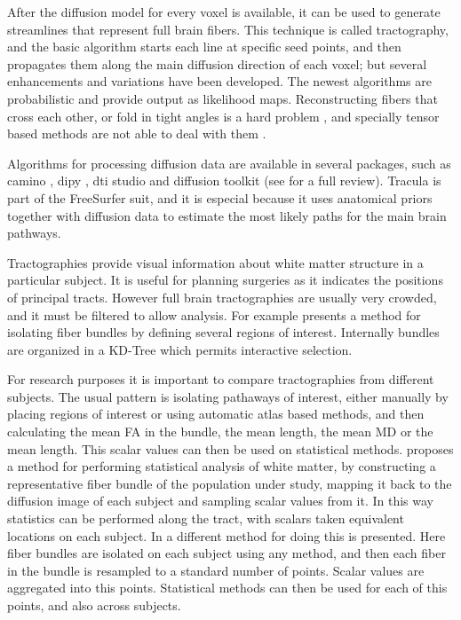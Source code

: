 After the diffusion model for every voxel is available, it can be used to generate streamlines that represent full brain fibers. This technique is called tractography, and the basic algorithm starts each line at specific seed points, and then propagates them along the main diffusion direction of each voxel; but several enhancements and variations have been developed. The newest algorithms are probabilistic \autocite{behrens_probabilistic_2007} and provide output as likelihood maps.
Reconstructing fibers that cross each other, or fold in tight angles is a hard problem \autocite{fillard_quantitative_2011}, and specially tensor based methods are not able to deal with them \autocite{tournier_diffusion_2011}. 

Algorithms for processing diffusion data are available in several packages, such as camino \autocite{cook_camino:_2006}, dipy \autocite{garyfallidis_dipy_2014}, dti studio \autocite{jiang_dtistudio:_2006} and diffusion toolkit \autocite{wang_diffusion_2007}
(see \autocite{hasan_review_2011} for a full review). 
Tracula \autocite{yendiki_probabilistic_2008} is part of the FreeSurfer suit, and it is especial because it uses anatomical priors together with diffusion data to estimate the most likely paths for the main brain pathways.


Tractographies provide visual information about white matter structure in a particular subject. It is useful for planning surgeries as it indicates the positions of principal tracts. However full brain tractographies are usually very crowded, and it must be filtered to allow analysis. 
For example \autocite{blaas_fast_2005} presents a method for isolating fiber bundles by defining several regions of interest. Internally bundles are organized in a KD-Tree which permits interactive selection. 


For research purposes it is important to compare tractographies from different subjects. The usual pattern is isolating pathaways of interest, either manually by placing regions of interest or using automatic atlas based methods, and then calculating the mean FA in the bundle, the mean length, the mean MD or the mean length. This scalar values can then be used on statistical methods.
\autocite{goodlett_group_2008} proposes a method for performing statistical analysis of white matter, by constructing a representative fiber bundle of the population under study, mapping it back to the diffusion image of each subject and sampling scalar values from it. In this way statistics can be performed along the tract, with scalars taken equivalent locations on each subject. In \autocite{colby_along-tract_2011} a different method for doing this is presented. Here fiber bundles are isolated on each subject using any method, and then each fiber in the bundle is resampled to a standard number of points. Scalar values are aggregated into this points. Statistical methods can then be used for each of this points, and also across subjects.

